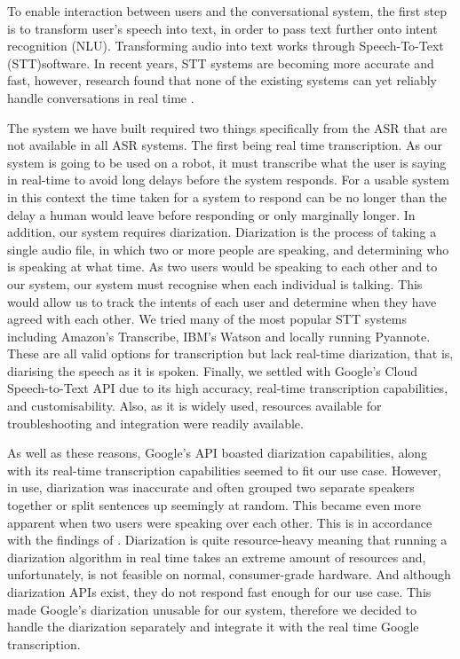 \documentclass[hidelinks, 11pt]{article}
\begin{document}
To enable interaction between users and the conversational system, the first step is to transform user's speech into text, in order to pass text further onto intent recognition (NLU). Transforming audio into text works through Speech-To-Text (STT)software. In recent years, STT systems are becoming more accurate and fast, however, research found that none of the existing systems can yet reliably handle conversations in real time \cite{Addlesee_Yu_Eshghi_2020}.

The system we  have built required two things specifically from the ASR that are not available in all ASR systems. The first being real time transcription. As our system is going to be used on a robot, it must transcribe what the user is saying in real-time to avoid long delays before the system responds. For a usable system in this context the time taken for a system to respond can be no longer than the delay a human would leave before responding or only marginally longer. In addition, our system requires diarization. Diarization is the process of taking a single audio file, in which two or more people are speaking, and determining who is speaking at what time. As two users would be speaking to each other and to our system, our system must recognise when each individual is talking.  This would allow us to track the intents of each user and determine when they have agreed with each other.
We tried many of the most popular STT systems including Amazon's Transcribe, IBM's Watson and locally running Pyannote. These are all valid options for transcription but lack real-time diarization, that is, diarising the speech as it is spoken.
Finally, we  settled with Google's Cloud Speech-to-Text API due to its high accuracy, real-time transcription capabilities, and customisability. Also, as it is widely used, resources available for troubleshooting and integration were readily available.

As well as these reasons, Google's API boasted diarization capabilities, along with its real-time transcription capabilities seemed to fit our use case. However, in use, diarization was inaccurate and often grouped two separate speakers together or split sentences up seemingly at random. This became even more apparent when two users were speaking over each other. This is in accordance with the findings of \cite{addlesee_comprehensive_2020}. Diarization is quite resource-heavy meaning that running a diarization algorithm in real time takes an extreme amount of resources and, unfortunately, is not feasible on normal, consumer-grade hardware. And although diarization APIs exist, they do not respond fast enough for our use case. This made Google's diarization unusable for our system, therefore we decided to handle the diarization separately and integrate it with the real time Google transcription.
\end{document}
